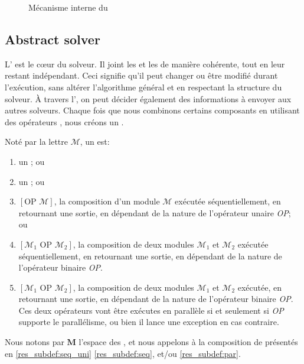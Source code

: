 \begin{figure}
	\centering
	\hspace{0.05\textwidth}%
	\caption[]{Mécanisme interne du \opch}
	\label{res_fig:ochperform}
\end{figure}%

\subsection{Abstract solver}

L'\as{}  est le c\oe{}ur du solveur. Il joint les \oms{} et les \opchs{} de  manière cohérente, tout en leur restant indépendant. Ceci signifie  qu'il peut changer ou être modifié durant l'exécution, sans altérer  l'algorithme général et en respectant la structure du solveur.  À  travers  l'\as, on peut décider également des informations à envoyer aux autres solveurs. Chaque fois que nous combinons certains composants en utilisant des opérateurs \posl{}, nous créons un \INTROm.

\begin{lemma}
\label{res_def:cm}
Noté par la lettre $\mathcal{M}$, un {\bf \m} est:
\begin{enumerate}\renewcommand{\labelitemi}{\scriptsize$\blacksquare$}
\item un \om{}; ou
\item un \opch{}; ou
\item $\left[\mbox{OP } \mathcal{M}\right]$, la composition d'un module $\mathcal{M}$ exécutée séquentiellement, en retournant une sortie, en dépendant de la nature de l'opérateur unaire \emph{OP}; ou \label{res_subdef:seq_uni}
\item $\left[\mathcal{M}_1 \mbox{ OP } \mathcal{M}_2\right]$, la composition de deux modules $\mathcal{M}_1$ et $\mathcal{M}_2$ exécutée séquentiellement, en retournant une sortie, en dépendant de la nature de l'opérateur binaire \emph{OP}.\label{res_subdef:seq}
\item $\left[\mathcal{M}_1 \mbox{ OP } \mathcal{M}_2\right]$, la composition de deux modules $\mathcal{M}_1$ et $\mathcal{M}_2$ exécutée, en retournant une sortie, en dépendant de la nature de l'opérateur binaire \emph{OP}. Ces deux opérateurs vont être exécutes en parallèle si et seulement si \emph{OP} supporte le parallélisme, ou bien il lance une exception en cas contraire.\label{res_subdef:par}
\end{enumerate}
Nous notons par $\mathbf{M}$ l'espace des \ms, et nous appelons \cms{} à la composition de \ms{} présentés en \ref{res_subdef:seq_uni} \ref{res_subdef:seq}, et/ou \ref{res_subdef:par}.
\end{lemma}

